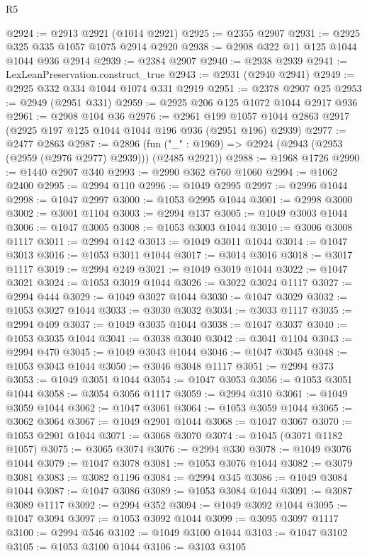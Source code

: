 \begin{lexlean}{R5}
\begin{coremodule}
@2924 := @2913 @2921 (@1014 @2921)
@2925 := @2355 @2907
@2931 := @2925 @325 @335 @1057 @1075 @2914 @2920
@2938 := @2908 @322 @11 @125 @1044 @1044 @936 @2914
@2939 := @2384 @2907
@2940 := @2938 @2939
@2941 := LexLeanPreservation.construct_true
@2943 := @2931 (@2940 @2941)
@2949 := @2925 @332 @334 @1044 @1074 @331 @2919
@2951 := @2378 @2907 @25
@2953 := @2949 (@2951 @331)
@2959 := @2925 @206 @125 @1072 @1044 @2917 @936
@2961 := @2908 @104 @36
@2976 := @2961
    @199
    @1057
    @1044
    @2863
    @2917
    (@2925 @197 @125 @1044 @1044 @196 @936 (@2951 @196) @2939)
@2977 := @2477 @2863
@2987 := @2896
    (fun ("_" : @1969) => @2924 (@2943 (@2953 (@2959 (@2976 @2977) @2939))) (@2485 @2921))
@2988 := @1968 @1726
@2990 := @1440 @2907 @340
@2993 := @2990 @362 @760 @1060
@2994 := @1062 @2400
@2995 := @2994 @110
@2996 := @1049 @2995
@2997 := @2996 @1044
@2998 := @1047 @2997
@3000 := @1053 @2995 @1044
@3001 := @2998 @3000
@3002 := @3001 @1104
@3003 := @2994 @137
@3005 := @1049 @3003 @1044
@3006 := @1047 @3005
@3008 := @1053 @3003 @1044
@3010 := @3006 @3008 @1117
@3011 := @2994 @142
@3013 := @1049 @3011 @1044
@3014 := @1047 @3013
@3016 := @1053 @3011 @1044
@3017 := @3014 @3016
@3018 := @3017 @1117
@3019 := @2994 @249
@3021 := @1049 @3019 @1044
@3022 := @1047 @3021
@3024 := @1053 @3019 @1044
@3026 := @3022 @3024 @1117
@3027 := @2994 @444
@3029 := @1049 @3027 @1044
@3030 := @1047 @3029
@3032 := @1053 @3027 @1044
@3033 := @3030 @3032
@3034 := @3033 @1117
@3035 := @2994 @409
@3037 := @1049 @3035 @1044
@3038 := @1047 @3037
@3040 := @1053 @3035 @1044
@3041 := @3038 @3040
@3042 := @3041 @1104
@3043 := @2994 @470
@3045 := @1049 @3043 @1044
@3046 := @1047 @3045
@3048 := @1053 @3043 @1044
@3050 := @3046 @3048 @1117
@3051 := @2994 @373
@3053 := @1049 @3051 @1044
@3054 := @1047 @3053
@3056 := @1053 @3051 @1044
@3058 := @3054 @3056 @1117
@3059 := @2994 @310
@3061 := @1049 @3059 @1044
@3062 := @1047 @3061
@3064 := @1053 @3059 @1044
@3065 := @3062 @3064
@3067 := @1049 @2901 @1044
@3068 := @1047 @3067
@3070 := @1053 @2901 @1044
@3071 := @3068 @3070
@3074 := @1045 (@3071 @1182 @1057)
@3075 := @3065 @3074
@3076 := @2994 @330
@3078 := @1049 @3076 @1044
@3079 := @1047 @3078
@3081 := @1053 @3076 @1044
@3082 := @3079 @3081
@3083 := @3082 @1196
@3084 := @2994 @345
@3086 := @1049 @3084 @1044
@3087 := @1047 @3086
@3089 := @1053 @3084 @1044
@3091 := @3087 @3089 @1117
@3092 := @2994 @352
@3094 := @1049 @3092 @1044
@3095 := @1047 @3094
@3097 := @1053 @3092 @1044
@3099 := @3095 @3097 @1117
@3100 := @2994 @546
@3102 := @1049 @3100 @1044
@3103 := @1047 @3102
@3105 := @1053 @3100 @1044
@3106 := @3103 @3105

\end{coremodule}
\end{lexlean}
